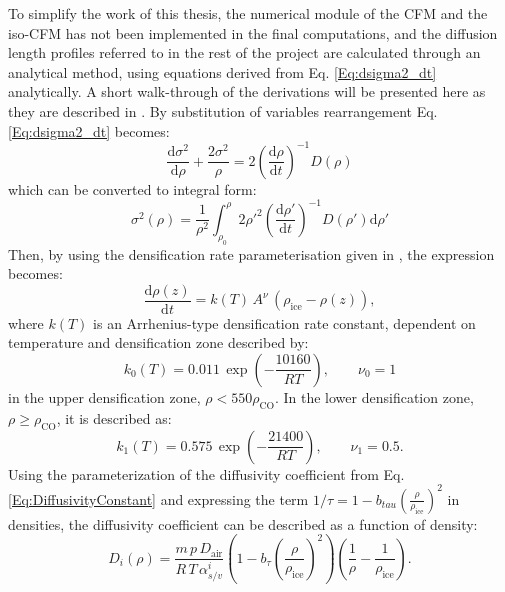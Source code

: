 \documentclass[../../CompleteThesis/Complete_1stDraft.tex]{subfiles}
\begin{document}
To simplify the work of this thesis, the numerical module of the CFM and the iso-CFM has not been implemented in the final computations, and the diffusion length profiles referred to in the rest of the project are calculated through an analytical method, using equations derived from Eq. \ref{Eq:dsigma2_dt} analytically. A short walk-through of the derivations will be presented here as they are described in \cite[Gkinis et al., 2021]{Gkinis2021}.
By substitution of variables rearrangement Eq. \ref{Eq:dsigma2_dt} becomes:
\begin{equation}
	\frac{\text{d}\sigma^2}{\text{d}\rho} + \frac{2\sigma^2}{\rho} = 2\left(\frac{\text{d}\rho}{\text{d}t}\right)^{-1}D(\rho)
	\label{Eq:dsigma_dt_rearrange}
\end{equation}
which can be converted to integral form:
\begin{equation}
	\sigma^2(\rho) = \frac{1}{\rho^2}\int_{\rho_0}^{\rho}2\rho'^2\left(\frac{\text{d}\rho'}{\text{d}t}\right)^{-1}D(\rho')\text{d}\rho'
	\label{Eq:sigma2_rho_integral}
\end{equation}
Then, by using the densification rate parameterisation given in \cite[Herron and Langway, 1980]{HerronLangway1980}, the expression becomes:
\begin{equation}
	\frac{\text{d}\rho(z)}{\text{d}t} = k(T)\, A^{\nu}\, (\rho_{\text{ice}} - \rho(z)),
	\label{Eq:drho_dt}
\end{equation}
where $k(T)$ is an Arrhenius-type densification rate constant, dependent on temperature and densification zone described by:
\begin{equation}
	k_0(T) = 0.011\, \exp\left(-\frac{10160}{RT}\right), \qquad \nu_0 = 1
	\label{Eq:ArrCoeff_Zone1}
\end{equation}
in the upper densification zone, $\rho < 550 \rho_{\text{CO}}$. In the lower densification zone, $\rho \geq \rho_{\text{CO}}$, it is described as:
\begin{equation}
	k_1(T) = 0.575\, \exp\left(-\frac{21400}{RT}\right), \qquad \nu_1 = 0.5.
	\label{Eq:ArrCoeff_Zone2}
\end{equation}
Using the parameterization of the diffusivity coefficient from Eq. \ref{Eq:DiffusivityConstant} and expressing the term $1/\tau = 1-b_{tau}\left(\frac{\rho}{\rho_{\text{ice}}}\right)^2$ in densities, the diffusivity coefficient can be described as a function of density:
\begin{equation}
	D_i(\rho) = \frac{m \, p \, D_{\text{air}}}{R \, T \, \alpha_{s/v}^i}\left(1-b_{\tau}\left(\frac{\rho}{\rho_{\text{ice}}}\right)^2\right)\left(\frac{1}{\rho} - \frac{1}{\rho_{\text{ice}}}\right).
	\label{Eq:DiffusivityConstant_2}
\end{equation}
\end{document}
